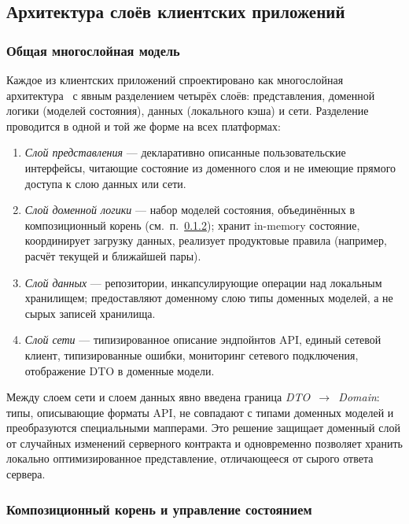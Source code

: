 \subsection{Архитектура слоёв клиентских приложений}
\label{subsec:client-layers}

\subsubsection{Общая многослойная модель}
\label{subsubsec:layers-overview}

Каждое из клиентских приложений спроектировано как многослойная архитектура~\cite{martin-clean-arch, fowler-eaa} с явным разделением четырёх слоёв: представления, доменной логики (моделей состояния), данных (локального кэша) и сети. Разделение проводится в одной и той же форме на всех платформах:

\begin{enumerate}
  \item \emph{Слой представления} --- декларативно описанные пользовательские интерфейсы, читающие состояние из доменного слоя и не имеющие прямого доступа к слою данных или сети.
  \item \emph{Слой доменной логики} --- набор моделей состояния, объединённых в композиционный корень (см.~п.~\ref{subsubsec:composition-root}); хранит in-memory состояние, координирует загрузку данных, реализует продуктовые правила (например, расчёт текущей и ближайшей пары).
  \item \emph{Слой данных} --- репозитории, инкапсулирующие операции над локальным хранилищем; предоставляют доменному слою типы доменных моделей, а не сырых записей хранилища.
  \item \emph{Слой сети} --- типизированное описание эндпойнтов API, единый сетевой клиент, типизированные ошибки, мониторинг сетевого подключения, отображение DTO в доменные модели.
\end{enumerate}

Между слоем сети и слоем данных явно введена граница \emph{DTO~$\to$~Domain}: типы, описывающие форматы API, не совпадают с типами доменных моделей и преобразуются специальными мапперами. Это решение защищает доменный слой от случайных изменений серверного контракта и одновременно позволяет хранить локально оптимизированное представление, отличающееся от сырого ответа сервера.

\subsubsection{Композиционный корень и управление состоянием}
\label{subsubsec:composition-root}

